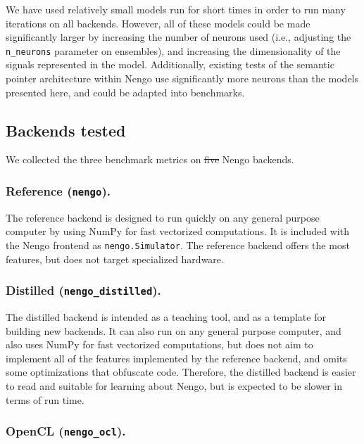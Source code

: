 \documentclass{frontiersSCNS}
\providecommand{\DIFadd}[1]{{\protect\color{blue}\uwave{#1}}} %
\providecommand{\DIFdel}[1]{{\protect\color{red}\sout{#1}}}                      %
\providecommand{\DIFaddbegin}{} %
\providecommand{\DIFaddend}{} %
\providecommand{\DIFdelbegin}{} %
\providecommand{\DIFdelend}{} %
\begin{document}
We have used relatively small
models run for short times in order
to run many iterations on all backends.
However, all of these models
could be made significantly larger
by increasing the number of neurons used
(i.e., adjusting the \texttt{n\_neurons}
parameter on ensembles),
and increasing the dimensionality
of the signals represented in the model.
Additionally, existing tests
of the semantic pointer architecture
within Nengo use significantly more neurons
than the models presented here,
and could be adapted into benchmarks.

\subsection{Backends tested}

We collected the three benchmark metrics
on \DIFdelbegin \DIFdel{five }\DIFdelend \DIFaddbegin \DIFadd{four }\DIFaddend Nengo backends.

\subsubsection{Reference (\texttt{nengo}).}

The reference backend is designed to run quickly
on any general purpose computer
by using NumPy \citep{vanderwalt2011}
for fast vectorized computations.
It is included with the Nengo frontend
as \texttt{nengo.Simulator}.
The reference backend offers
the most features, but does not target
specialized hardware.

\subsubsection{Distilled (\texttt{nengo\_distilled}).}

The distilled backend is intended as a teaching tool,
and as a template for building new backends.
It can also run on any general purpose computer,
and also uses NumPy for fast vectorized computations,
but does not aim to implement all of the features
implemented by the reference backend,
and omits some optimizations that obfuscate code.
Therefore, the distilled backend is easier to read
and suitable for learning about Nengo,
but is expected to be slower in terms of run time.

\subsubsection{OpenCL (\texttt{nengo\_ocl}).}
\end{document}
